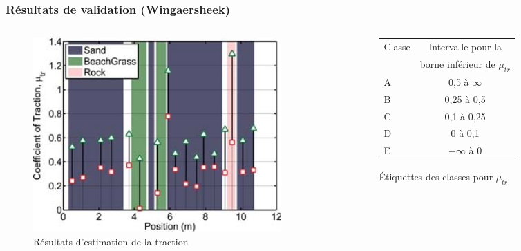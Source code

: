     \begin{frame}
        \frametitle{Résultats de validation (Wingaersheek)}
        \begin{columns}[c]
            \begin{column}{0.5\textwidth}
                \begin{figure}
                    \includegraphics[width=0.9\textwidth]{./media/beachTraction.jpg}
                    \captionsetup{justification=centering}
                    \caption{Résultats d'estimation de la traction}
                \end{figure}                                
            \end{column}
            \small
            \begin{column}{0.5\textwidth}
                \vspace{-11mm}
                \begin{figure}  
                \begin{tabular}{lc}
                    \hline
                    Classe & Intervalle pour la \\&borne inférieur de $\mu_{tr}$ \\
                    \hline
                    A & 0,5 à $\infty$\\
                    B & 0,25 à 0,5\\
                    C & 0,1 à 0,25\\
                    D & 0 à 0,1\\
                    E & $-\infty$ à 0\\
                    \hline           
                \end{tabular}
                \captionsetup{justification=centering}
                \caption{Étiquettes des classes pour $\mu_{tr}$}
                \end{figure}
            \end{column}
        \end{columns}
    \end{frame}       
    